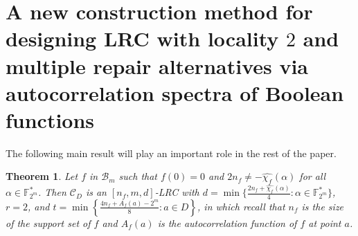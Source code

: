 \documentclass[10pt]{article}
\newtheorem{theorem}{Theorem}
\newcommand{\F}{\mathbb{F}}
\newcommand{\0}{\textbf{0}}
\newcommand{\1}{\textbf{1}}
\newcommand{\C}{{\mathcal C}}
\newcommand{\W}[2][]{\widehat{\chi_{#2}}^{#1}}
\begin{document}
\section{A new construction method  for designing LRC with locality $2$  and multiple repair alternatives via autocorrelation spectra of Boolean functions}\label{Sec-LRC-Bool-Functions}
The following main result will play an important role in the rest of the paper.
\begin{theorem}\label{T:relation}
Let $f$ in $\mathcal{B}_m$ such that $f(0)=0$
and $2n_f\not=-\W f(\alpha)$ for all $\alpha\in\F_{2^m}^*$.
Then $\C_D$ is an $[n_f, m, d]$-LRC with $d=\min\{\frac{2n_f+\W f(\alpha)}{4} : \alpha\in\F_{2^m}^*\}$, $r=2$,
and $t=\min\left\{\frac{4n_f+A_f(a)-2^m}{8} : a\in D\right\}$,
in which recall that $n_f$ is the size of the support set of $f$ and $A_f(a)$ is the autocorrelation function of $f$ at point $a$.

\end{theorem}
\end{document}
